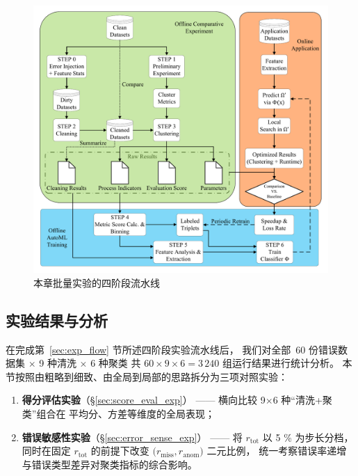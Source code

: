 \documentclass[10pt]{article} %
\numberwithin{equation}{section}
\begin{document}
\begin{figure}[t]
  \centering
  \includegraphics[width=0.95\linewidth]{figures/4graph/flowchart1.pdf}
  \caption{本章批量实验的四阶段流水线}
  \label{fig:exp_flow}
\end{figure}

\subsection{\textcolor[rgb]{0.00,0.07,1.00}{实验结果与分析}}
\label{sec:exp_results}

在完成第~\ref{sec:exp_flow} 节所述四阶段实验流水线后，
我们对全部 \(\,60\) 份错误数据集
\(\times\) 9 种清洗 \(\times\) 6 种聚类
共 \(60\times9\times6=3\,240\) 组运行结果进行统计分析。
本节按照由粗略到细致、由全局到局部的思路拆分为三项对照实验：

\begin{enumerate}[leftmargin=2.5em]
  \item \textbf{得分评估实验}（\S\ref{sec:score_eval_exp}）  
        —— 横向比较 9\(\times\)6 种“清洗+聚类”组合在
        平均分、方差等维度的全局表现；
  \item \textbf{错误敏感性实验}（\S\ref{sec:error_sense_exp}）  
        —— 将 \(r_{\text{tot}}\) 以 5 \% 为步长分档，  
        同时在固定 \(r_{\text{tot}}\) 的前提下改变
        \(\bigl(r_{\text{miss}},r_{\text{anom}}\bigr)\) 二元比例，  
        统一考察错误率递增与错误类型差异对聚类指标的综合影响。
\end{enumerate}
\end{document}
